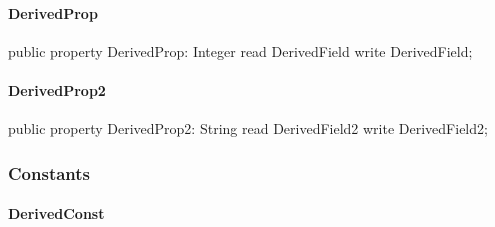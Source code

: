 \documentclass{report}
\begin{document}
\paragraph*{DerivedProp}\hspace*{\fill}

\begin{list}{}{
\setlength{\itemindent}{0cm}
\setlength{\listparindent}{0cm}
\setlength{\leftmargin}{\evensidemargin}
\addtolength{\leftmargin}{\tmplength}
\settowidth{\labelsep}{X}
\addtolength{\leftmargin}{\labelsep}
\setlength{\labelwidth}{\tmplength}
}
\begin{flushleft}
\item[\textbf{Declaration}\hfill]
\begin{ttfamily}
public property DerivedProp: Integer read DerivedField write DerivedField;\end{ttfamily}


\end{flushleft}
\end{list}
\paragraph*{DerivedProp2}\hspace*{\fill}

\begin{list}{}{
\setlength{\itemindent}{0cm}
\setlength{\listparindent}{0cm}
\setlength{\leftmargin}{\evensidemargin}
\addtolength{\leftmargin}{\tmplength}
\settowidth{\labelsep}{X}
\addtolength{\leftmargin}{\labelsep}
\setlength{\labelwidth}{\tmplength}
}
\begin{flushleft}
\item[\textbf{Declaration}\hfill]
\begin{ttfamily}
public property DerivedProp2: String read DerivedField2 write DerivedField2;\end{ttfamily}


\end{flushleft}
\end{list}
\subsubsection*{\large{\textbf{Constants}}\normalsize\hspace{1ex}\hfill}
\paragraph*{DerivedConst}\hspace*{\fill}
\end{document}
